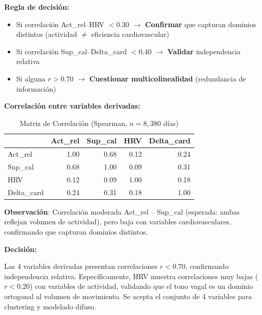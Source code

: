 \documentclass[12pt,letterpaper,twoside]{report}
\begin{document}
\begin{reglabox}
\textbf{Regla de decisión:}

\begin{itemize}[noitemsep]
    \item Si correlación Act\_rel--HRV $< 0.30$ $\to$ \textbf{Confirmar} que capturan dominios distintos (actividad $\neq$ eficiencia cardiovascular)
    \item Si correlación Sup\_cal--Delta\_card $< 0.40$ $\to$ \textbf{Validar} independencia relativa
    \item Si alguna $r > 0.70$ $\to$ \textbf{Cuestionar multicolinealidad} (redundancia de información)
\end{itemize}
\end{reglabox}

\begin{calculobox}
\textbf{Correlación entre variables derivadas:}

\begin{table}[H]
\centering
\begin{tabular}{@{}lrrrr@{}}
\toprule
 & \textbf{Act\_rel} & \textbf{Sup\_cal} & \textbf{HRV} & \textbf{Delta\_card} \\
\midrule
Act\_rel     & 1.00 & 0.68 & 0.12 & 0.24 \\
Sup\_cal     & 0.68 & 1.00 & 0.09 & 0.31 \\
HRV          & 0.12 & 0.09 & 1.00 & 0.18 \\
Delta\_card  & 0.24 & 0.31 & 0.18 & 1.00 \\
\bottomrule
\end{tabular}
\caption{Matriz de Correlación (Spearman, $n=8,380$ días)}
\label{tab:derived_corr}
\end{table}

\textbf{Observación}: Correlación moderada Act\_rel -- Sup\_cal (esperada: ambas reflejan volumen de actividad), pero baja con variables cardiovasculares, confirmando que capturan dominios distintos.
\end{calculobox}

\begin{decisionbox}
\textbf{Decisión:}

Las 4 variables derivadas presentan correlaciones $r < 0.70$, confirmando independencia relativa. Específicamente, HRV muestra correlaciones muy bajas ($r < 0.20$) con variables de actividad, validando que el tono vagal es un dominio ortogonal al volumen de movimiento. Se acepta el conjunto de 4 variables para clustering y modelado difuso.
\end{decisionbox}
\end{document}
